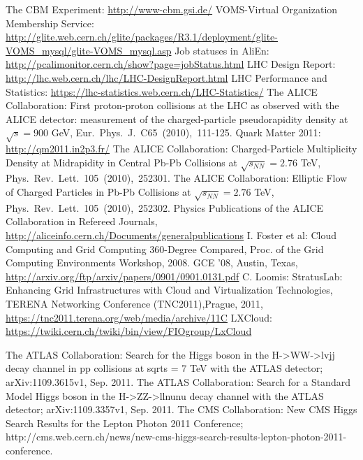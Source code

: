 \begin{thebibliography}{100}
  The CBM Experiment: \url{http://www-cbm.gsi.de/}
%
 VOMS-Virtual Organization Membership Service:
\newline\url{http://glite.web.cern.ch/glite/packages/R3.1/deployment/glite-VOMS_mysql/glite-VOMS_mysql.asp}
%
 Job statuses in AliEn:
\newline\url{http://pcalimonitor.cern.ch/show?page=jobStatus.html}
%
%
 LHC Design Report:
\url{http://lhc.web.cern.ch/lhc/LHC-DesignReport.html}
%
 LHC Performance and Statistics:
\newline\url{https://lhc-statistics.web.cern.ch/LHC-Statistics/}
%
 The ALICE Collaboration: First proton-proton
collisions at the LHC as observed with the ALICE detector:
measurement of the charged-particle
        pseudorapidity density at $\sqrt{s}=900$ GeV, Eur.~Phys.~J.~C65~(2010),~111-125.
%
 Quark Matter 2011: \url{http://qm2011.in2p3.fr/}
%
 The ALICE
Collaboration: Charged-Particle Multiplicity Density at Midrapidity
in Central Pb-Pb Collisions at $\sqrt{s_{NN}}=2.76$ TeV,
        Phys.~Rev.~Lett.~105~(2010),~252301.
%
 The ALICE Collaboration: Elliptic Flow of Charged Particles
in Pb-Pb Collisions at $\sqrt{s_{NN}}=2.76$ TeV,
Phys.~Rev.~Lett.~105~(2010),~252302.
%
 Physics Publications of the ALICE
Collaboration in Refereed Journals,
\newline\url{http://aliceinfo.cern.ch/Documents/generalpublications}
%
%
 I. Foster et al: Cloud Computing and Grid Computing
360-Degree Compared, Proc. of the Grid Computing Environments
Workshop, 2008. GCE '08, Austin, Texas,
\newline\url{http://arxiv.org/ftp/arxiv/papers/0901/0901.0131.pdf}
%
 C. Loomis: StratusLab: Enhancing Grid Infrastructures with
Cloud and Virtualization Technologies, TERENA Networking Conference
(TNC2011),Prague, 2011,
\newline\url{https://tnc2011.terena.org/web/media/archive/11C}
%
 LXCloud:
\url{https://twiki.cern.ch/twiki/bin/view/FIOgroup/LxCloud}

The
ATLAS Collaboration: Search for the Higgs boson in the H->WW->lvjj
decay channel in pp collisions at sqrt{s} = 7 TeV with the ATLAS
detector; arXiv:1109.3615v1, Sep. 2011.
 The ATLAS Collaboration: Search for a Standard Model Higgs boson in the
H->ZZ->llnunu decay channel with the ATLAS detector;
arXiv:1109.3357v1, Sep. 2011.
The CMS Collaboration: New CMS Higgs Search Results for the Lepton Photon 2011
Conference;
http://cms.web.cern.ch/news/new-cms-higgs-search-results-lepton-photon-2011-conference.


\end{thebibliography}
